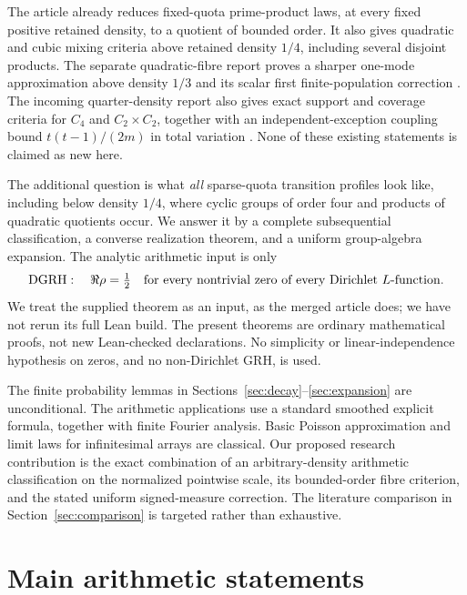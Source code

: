 \documentclass[11pt]{article}
\theoremstyle{remark}\newtheorem{remark}[theorem]{Remark}
\newcommand{\DGRH}{\textup{DGRH}}
\begin{document}
The article already reduces fixed-quota prime-product laws, at every fixed positive retained density, to a quotient of bounded order. It also gives quadratic and cubic mixing criteria above retained density $1/4$, including several disjoint products. The separate quadratic-fibre report proves a sharper one-mode approximation above density $1/3$ and its scalar first finite-population correction \cite{quadratic}. The incoming quarter-density report also gives exact support and coverage criteria for $C_4$ and $C_2\times C_2$, together with an independent-exception coupling bound $t(t-1)/(2m)$ in total variation \cite{quarter}. None of these existing statements is claimed as new here.

The additional question is what \emph{all} sparse-quota transition profiles look like, including below density $1/4$, where cyclic groups of order four and products of quadratic quotients occur. We answer it by a complete subsequential classification, a converse realization theorem, and a uniform group-algebra expansion. The analytic arithmetic input is only
\[
 \DGRH:\quad \Re\rho=\tfrac12
 \quad\text{for every nontrivial zero of every Dirichlet $L$-function}.
\]
We treat the supplied theorem as an input, as the merged article does; we have not rerun its full Lean build. The present theorems are ordinary mathematical proofs, not new Lean-checked declarations. No simplicity or linear-independence hypothesis on zeros, and no non-Dirichlet GRH, is used.

The finite probability lemmas in Sections~\ref{sec:decay}--\ref{sec:expansion} are unconditional. The arithmetic applications use a standard smoothed explicit formula, together with finite Fourier analysis. Basic Poisson approximation and limit laws for infinitesimal arrays are classical. Our proposed research contribution is the exact combination of an arbitrary-density arithmetic classification on the normalized pointwise scale, its bounded-order fibre criterion, and the stated uniform signed-measure correction. The literature comparison in Section~\ref{sec:comparison} is targeted rather than exhaustive.

\section{Main arithmetic statements}\label{sec:main}
\end{document}
